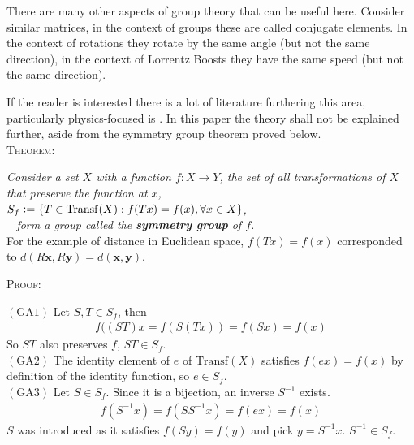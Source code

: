  There are many other aspects of group theory that can be useful here. Consider similar matrices, in the context of groups these are called conjugate elements. In the context of rotations they rotate by the same angle (but not the same direction), in the context of Lorrentz Boosts they have the same speed (but not the same direction).
 
 If the reader is interested there is a lot of literature furthering this area, particularly physics-focused is \cite{SCPV3}. In this paper the theory shall not be explained further, aside from the symmetry group theorem proved below. 
\vspace{2mm} \\
\textsc{Theorem:}

{\centering \textit{Consider a set $X$ with a function $f:X\rightarrow Y$, the set of all transformations of $X$ that preserve the function at $x$,\\
$S_f\vcentcolon =\{ T \in \mathrm{Transf}(X) : f(Tx)=f(x), \forall x \in X \}$,\\
$\phantom{a}$ \hspace{48mm} form a group called the \textbf{symmetry group} of $f$.}}
\vspace{2mm} \\

For the example of distance in Euclidean space, $f(Tx)=f(x)$ corresponded to $d(R\mathbf{x},R\mathbf{y}) = d(\mathbf{x},\mathbf{y})$.

\begin{flushleft}\textsc{Proof:} \end{flushleft}

$(\mathrm{GA}1)$ Let $S,T\in S_f$, then
\begin{align*}
f((ST)x=f(S(Tx))= f(Sx) = f(x)
\end{align*}
So $ST$ also preserves $f$, $ST \in S_f$. \\

$(\mathrm{GA}2)$ The identity element of $e$ of $\mathrm{Transf}(X)$ satisfies $f(ex)=f(x)$ by definition of the identity function, so $e \in S_f$.\\

$(\mathrm{GA}3)$  Let $S \in S_f$. Since it is a bijection, an inverse $S^{-1}$ exists. 
\begin{align*}
f(S^{-1}x) = f(SS^{-1}x)= f(ex)= f(x)
\end{align*}
$S$ was introduced as it satisfies $f(Sy)=f(y)$ and pick $y=S^{-1}x$. $S^{-1} \in S_f$.\\

